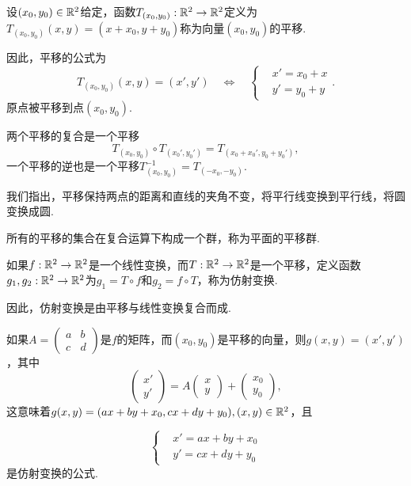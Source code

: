 \begin{definition}
  设$(x_0,y_0)\in\mathbb R^2$给定，函数$T_{(x_0,y_0)}:\mathbb R^2\to\mathbb R^2$定义为$T_{(x_0,y_0)}(x,y)=(x+x_0,y+y_0)$称为{\kaishu 向量$(x_0,y_0)$的平移}.
\end{definition}

因此，平移的公式为
\[
  T_{(x_0,y_0)}(x,y) = (x',y')\quad \Leftrightarrow \quad
  \left\{
     \begin{aligned}
       & x' = x_0 + x \\
       & y' = y_0 + y
     \end{aligned}
  \right..
\]
原点被平移到点$(x_0,y_0)$.

两个平移的复合是一个平移
\[
  T_{(x_0,y_0)}\circ T_{(x_0',y_0')} = T_{(x_0+x_0',y_0+y_0')},
\]
一个平移的逆也是一个平移$T^{-1}_{(x_0,y_0)}=T_{(-x_0,-y_0)}$.

我们指出，平移保持两点的距离和直线的夹角不变，将平行线变换到平行线，将圆变换成圆.

所有的平移的集合在复合运算下构成一个群，称为平面的{\kaishu 平移群}. 

\begin{definition}
  如果$f:\mathbb R^2\to\mathbb R^2$是一个线性变换，而$T:\mathbb R^2\to\mathbb R^2$是一个平移，定义函数$g_1,g_2:\mathbb R^2\to\mathbb R^2$为$g_1=T\circ f$和$g_2=f\circ T$，称为{\kaishu 仿射变换}. 
\end{definition}

因此，仿射变换是由平移与线性变换复合而成.

如果$A=\begin{pmatrix}
  a & b \\
  c & d
\end{pmatrix}$是$f$的矩阵，而$(x_0,y_0)$是平移的向量，则$g(x,y)=(x',y')$，其中
\[
  \begin{pmatrix}
    x' \\
    y'
  \end{pmatrix} = A\begin{pmatrix}
    x \\
    y
  \end{pmatrix} +
  \begin{pmatrix}
    x_0 \\
    y_0
  \end{pmatrix},
\]
这意味着$g(x,y)=(ax+by+x_0,cx+dy+y_0),(x,y)\in\mathbb R^2$，且
\begin{mybox}
  \[
    \left\{
      \begin{aligned}
        & x' = ax + by + x_0 \\
        & y' = cx + dy + y_0
      \end{aligned}
    \right.
  \]
  是仿射变换的公式.
\end{mybox}

